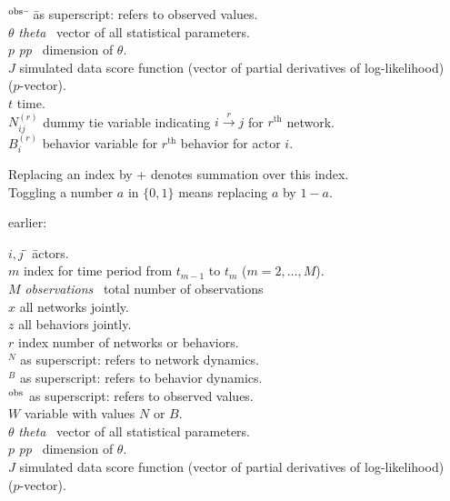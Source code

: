 \documentclass[a4paper,12pt,fleqn]{article}
\newcommand{\nnm}[1]{\textsf{\small\textit{#1}\ }}
\begin{document}
\begin{tabbing}
$^{\rm{obs}}$ \hspace*{1em} \=  \hspace*{6em} \= as superscript: refers to observed values.\\[1ex]
$\theta$ \> \nnm{theta} \> vector of all statistical parameters. \\[1ex]
$p$  \>  \nnm{pp}  \> dimension of $\theta$.\\[1ex]
$J$ \> \>  simulated data score function (vector of partial derivatives of log-likelihood) \\
     \>  \>    ($p$-vector).\\[1ex]
$t$ \hspace*{3em} \> \> time.\\[1ex]
$N^{(r)}_{ij}$ \> \> dummy tie variable indicating $ i \stackrel{r}{\rightarrow} j $ for $r^{\text{th}}$ network.\\[1ex]
$B^{(r)}_{i}$ \> \> behavior variable for $r^{\text{th}}$ behavior for actor $i$.
\end{tabbing}
\medskip

Replacing an index by + denotes summation over this index.\\
Toggling a number $a$ in $\{0, 1\}$ means replacing $a$ by $1-a$.
\medskip


\iffalse
earlier:
\begin{tabbing}
$i, j$ \hspace*{1em} \=  \hspace*{6em} \=  actors.\\[1ex]
$m$ \> \> index for time period from $t_{m-1}$ to $t_m$ ($m = 2, \ldots, M$).  \\[1ex]
$M$ \> \nnm{observations}   \> total number of observations\\[1ex]
$x$ \> \> all networks jointly.\\[1ex]
$z$ \> \> all behaviors jointly.\\[1ex]
$r$ \> \> index number of networks or behaviors.\\[1ex]
$^N$ \> \> as superscript: refers to network dynamics.\\[1ex]
$^B$ \> \> as superscript: refers to behavior dynamics.\\[1ex]
$^{\rm{obs}}$ \> \> as superscript: refers to observed values.\\[1ex]
$W$ \> \> variable with values $N$ or $B$.\\[1ex]
$\theta$ \> \nnm{theta} \> vector of all statistical parameters. \\[1ex]
$p$  \>  \nnm{pp}  \> dimension of $\theta$.\\[1ex]
$J$ \> \>  simulated data score function (vector of partial derivatives of log-likelihood) \\
     \>  \>    ($p$-vector).\\[1ex]
\end{tabbing}
\medskip
\end{document}
